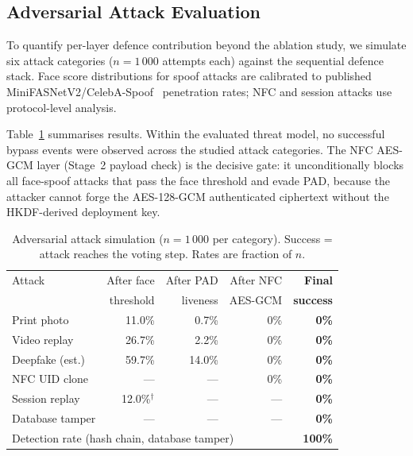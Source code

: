 \documentclass[pdflatex,sn-vancouver-num]{sn-jnl}%
\theoremstyle{thmstyleone}%
\theoremstyle{thmstyletwo}%
\theoremstyle{thmstylethree}%
\begin{document}
\subsection{Adversarial Attack Evaluation}\label{sec:adversarial}

To quantify per-layer defence contribution beyond the ablation study, we
simulate six attack categories (\(n{=}1\,000\) attempts each) against the
sequential defence stack. Face score distributions for spoof attacks are
calibrated to published MiniFASNetV2/CelebA-Spoof~\cite{zhang2020minifasnet}
penetration rates; NFC and session attacks use protocol-level analysis.

Table~\ref{tab:adversarial} summarises results. Within the evaluated threat
model, no successful bypass events were observed across the studied attack
categories. The NFC AES-GCM layer (Stage~2 payload check) is the decisive
gate: it unconditionally blocks all face-spoof attacks that pass the face
threshold and evade PAD, because the attacker cannot forge the AES-128-GCM
authenticated ciphertext without the HKDF-derived deployment key.

\begin{table}[t]
\caption{Adversarial attack simulation (\(n{=}1\,000\) per category).
  Success = attack reaches the voting step. Rates are fraction of \(n\).}
\label{tab:adversarial}%
\begin{tabular}{|l|r|r|r|r|}
  \hline
  Attack & After face & After PAD & After NFC & \textbf{Final} \\
         & threshold  & liveness  & AES-GCM   & \textbf{success} \\
  \hline
  Print photo      & 11.0\% & 0.7\%  & 0\% & \textbf{0\%} \\
  Video replay     & 26.7\% & 2.2\%  & 0\% & \textbf{0\%} \\
  Deepfake (est.)  & 59.7\% & 14.0\% & 0\% & \textbf{0\%} \\
  NFC UID clone    & ---    & ---    & 0\% & \textbf{0\%} \\
  Session replay   & 12.0\%$^\dagger$ & --- & --- & \textbf{0\%} \\
  Database tamper  & ---    & ---    & --- & \textbf{0\%} \\
  \hline
  \multicolumn{4}{l}{Detection rate (hash chain, database tamper)} & \textbf{100\%} \\
  \hline
\end{tabular}
\end{table}
\end{document}
